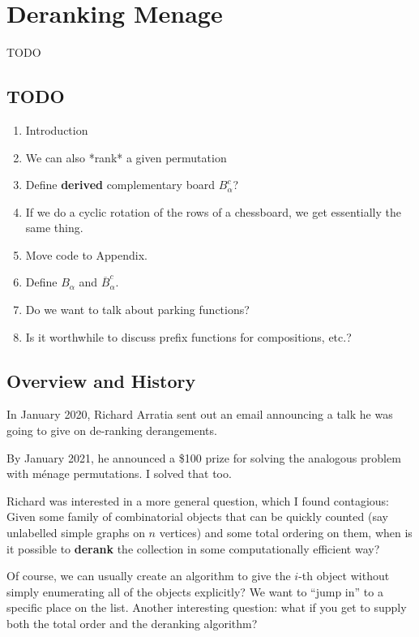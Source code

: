 \chapter{Deranking Menage}
\label{cha:UnrankingMenage}
TODO

\section{TODO}
\begin{enumerate}
  \item Introduction
  \item We can also *rank* a given permutation
  \item Define \textbf{derived} complementary board $B_\alpha^c$?
  \item If we do a cyclic rotation of the rows of a chessboard, we get
    essentially the same thing.
  \item Move code to Appendix.
  \item Define $B_\alpha$ and $\overline{B}_\alpha^c$.
  \item Do we want to talk about parking functions?
  \item Is it worthwhile to discuss prefix functions for compositions, etc.?
\end{enumerate}

\section{Overview and History}

In January 2020, Richard Arratia sent out an email announcing a talk he was
going to give on de-ranking derangements.

By January 2021, he announced a \$100 prize for solving the analogous problem
with m\'enage permutations. I solved that too.

Richard was interested in a more general question, which I found contagious:
Given some family of combinatorial objects that can be quickly counted
(say unlabelled simple graphs on $n$ vertices)
and some total ordering on them,
when is it possible to \textbf{derank} the collection in some computationally
efficient way?

Of course, we can usually create an algorithm to give the $i$-th object without
simply enumerating all of the objects explicitly? We want to ``jump in'' to a
specific place on the list. Another interesting question:
what if you get to supply both the total order and the deranking algorithm?

